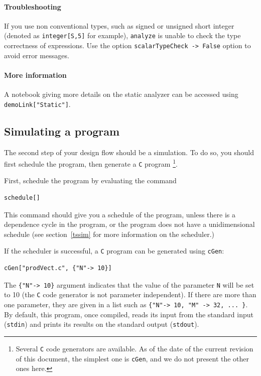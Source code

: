 \documentclass[12pt]{article}
\newcommand{\C}{\texttt{C}}
\begin{document}
\paragraph*{Troubleshooting}
If you use non conventional types, such as signed or 
unsigned short integer (denoted as \texttt{integer[S,5]} for
example), \texttt{analyze} is unable to check the type correctness
of expressions. Use the option \texttt{scalarTypeCheck -> False}
option to avoid error messages. 

\paragraph*{More information}
A notebook giving more details on the static analyzer can 
be accessed using \texttt{demoLink["Static"]}.

\subsection{Simulating a program}
\label{simulation}
The second step of your design flow 
should be a simulation. To do so, you
should first schedule the program, then generate a \C{} program
\footnote{Several \C{} code generators are available. As of 
the date of the current revision of this 
document, the simplest one is \texttt{cGen}, and we do not
present the other ones here.}.

First, schedule
the program by evaluating the command
\begin{verbatim}
schedule[]
\end{verbatim}
This command should give you a schedule of the program, 
unless there is a dependence cycle in the program, or the program
does not have a unidimensional schedule (see section~\ref{tssim} for
more information on the scheduler.)

If the scheduler is successful, a \C{} program can be generated using
\texttt{cGen}:
\begin{verbatim}
cGen["prodVect.c", {"N"-> 10}]
\end{verbatim}
The \texttt{\{"N"-> 10\}}
argument indicates that the value of the parameter {\tt N} will be set
to 10 (the {\tt C} code generator is not parameter independent).
If there are more than one parameter, they are given in a list 
such as \texttt{\{"N"-> 10, "M" -> 32, ... \}}. 
By default, this program, once compiled, reads its input from the
standard input ({\tt stdin}) and prints its results on the 
standard output ({\tt stdout}). 
\end{document}
